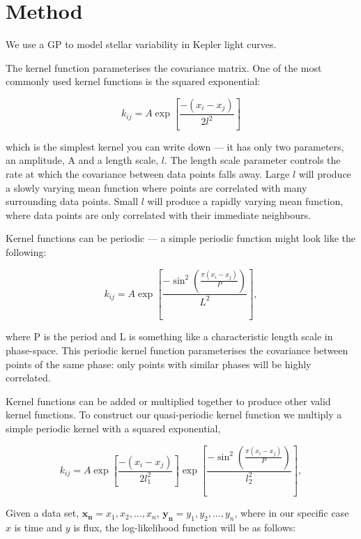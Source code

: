 \documentclass[10pt,preprint]{aastex}
\begin{document}
\section{Method}

We use a GP to model stellar variability in Kepler light curves.

The kernel function parameterises the covariance matrix.
One of the most commonly used kernel functions is the squared exponential:

\begin{equation}
	k_{ij} = A\exp\left[{\frac{-(x_i-x_j)}{2l^2}}\right]
\end{equation}

which is the simplest kernel you can write down --- it has only two parameters, an amplitude, A and a length scale, $l$.
The length scale parameter controls the rate at which the covariance between data points falls away.
Large $l$ will produce a slowly varying mean function where points are correlated with many surrounding data points.
Small $l$ will produce a rapidly varying mean function, where data points are only correlated with their immediate neighbours.

Kernel functions can be periodic --- a simple periodic function might look like the following:

\begin{equation}
	k_{ij} = A\exp\left[{\frac{-\sin^2\left({\frac{\pi(x_i-x_j)}{P}}\right)}{L^2}}\right],
\end{equation}

where P is the period and L is something like a characteristic length scale in phase-space.
This periodic kernel function parameterises the covariance between points of the same phase: only points with similar phases will be highly correlated.

Kernel functions can be added or multiplied together to produce other valid kernel functions.
To construct our quasi-periodic kernel function we multiply a simple periodic kernel with a squared exponential,

\begin{equation}
	k_{ij} = A\exp\left[{\frac{-(x_i-x_j)}{2l_1^2}}\right]\exp\left[\frac{-\sin^2\left(\frac{\pi(x_i-x_j)}{P}\right)}{l_2^2}\right],
\end{equation}

Given a data set, $\mathbf{x_n} = {x_1, x_2, ..., x_n}$, $\mathbf{y_n} = {y_1, y_2, ..., y_n}$, where in our specific case $x$ is time and $y$ is flux, the log-likelihood function will be as follows:
\end{document}
